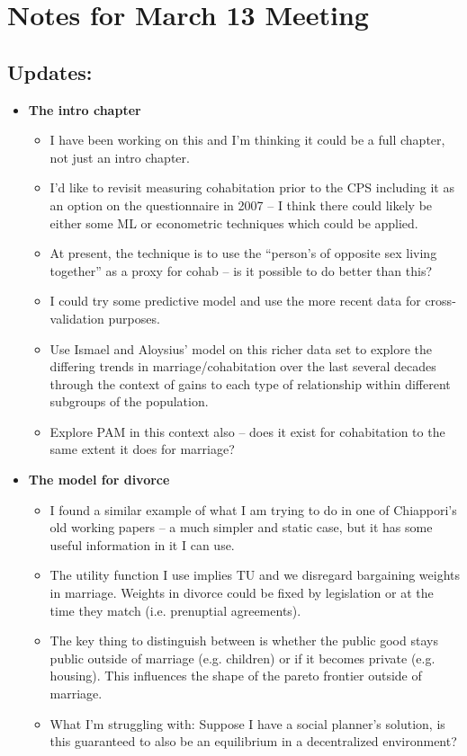 \documentclass{article}
\begin{document}

\section*{Notes for March 13 Meeting}
\subsection*{Updates:}

\begin{itemize}
\item \textbf{The intro chapter}
\begin{itemize}
\item I have been working on this and I'm thinking it could be a full chapter, not just an intro chapter.
\item I'd like to revisit measuring cohabitation prior to the CPS including it as an option on the questionnaire in 2007 -- I think there could likely be either some ML or econometric techniques which could be applied.
\item At present, the technique is to use the ``person's of opposite sex living together'' as a proxy for cohab -- is it possible to do better than this? 
\item I could try some predictive model and use the more recent data for cross-validation purposes.
\item Use Ismael and Aloysius' model on this richer data set to explore the differing trends in marriage/cohabitation over the last several decades through the context of gains to each type of relationship within different subgroups of the population.
\item Explore PAM in this context also -- does it exist for cohabitation to the same extent it does for marriage?

\end{itemize}

\item \textbf{The model for divorce}
\begin{itemize}
\item I found a similar example of what I am trying to do in one of Chiappori's old working papers -- a much simpler and static case, but it has some useful information in it I can use.
\item The utility function I use implies TU and we disregard bargaining weights in marriage. Weights in divorce could be fixed by legislation or at the time they match (i.e. prenuptial agreements).
\item The key thing to distinguish between is whether the public good stays public outside of marriage (e.g. children) or if it becomes private (e.g. housing). This influences the shape of the pareto frontier outside of marriage.
\item What I'm struggling with: Suppose I have a social planner's solution, is this guaranteed to also be an equilibrium in a decentralized environment? 
\end{itemize}



\end{itemize}
\end{document}

